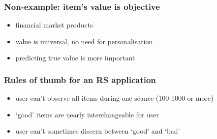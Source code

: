 \documentclass[t]{beamer}
\begin{document}
\begin{frame}
  \frametitle{Non-example: item's value is objective}
  \begin{itemize}
  \item financial market products
  \item value is universal, no need for personalisation
  \item predicting true value is more important
  \end{itemize}
\end{frame}
\begin{frame}
  \frametitle{Rules of thumb for an RS application}
  \begin{itemize}
  \item user can’t observe all items during one séance (100-1000 or more)
  \item `good' items are nearly interchangeable for user
  \item user can't sometimes discern between `good' and `bad'
  \end{itemize}
\end{frame}
\end{document}
